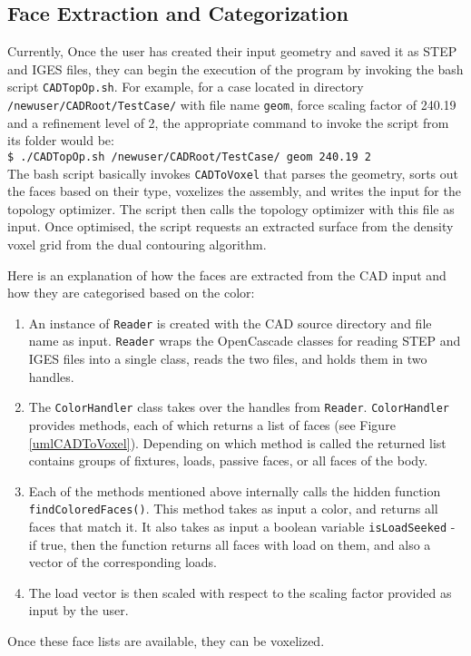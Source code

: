 \subsection{Face Extraction and Categorization}
\label{sec: FaceExtraction}


Currently, Once the user has created their input geometry and saved it as STEP and IGES files, they can begin the execution of the program by invoking the bash script \lstinline|CADTopOp.sh|. For example, for a case located in directory \lstinline|/newuser/CADRoot/TestCase/| with file name \lstinline|geom|, force scaling factor of 240.19 and a refinement level of 2, the appropriate command to invoke the script from its folder would be: \\

\lstinline|$ ./CADTopOp.sh /newuser/CADRoot/TestCase/ geom 240.19 2| \\

The bash script basically invokes \lstinline|CADToVoxel| that parses the geometry, sorts out the faces based on their type, voxelizes the assembly, and writes the input for the topology optimizer. The script then calls the topology optimizer with this file as input. Once optimised, the script requests an extracted surface from the density voxel grid from the dual contouring algorithm. 


Here is an explanation of how the faces are extracted from the CAD input and how they are categorised based on the color:

\begin{enumerate}
	\item An instance of \lstinline|Reader| is created with the CAD source directory and file name as input. \lstinline|Reader| wraps the OpenCascade classes for reading STEP and IGES files into a single class, reads the two files, and holds them in two handles.
	\item The \lstinline|ColorHandler| class takes over the handles from \lstinline|Reader|. \lstinline|ColorHandler| provides methods, each of which returns a list of faces (see Figure \ref{umlCADToVoxel}). Depending on which method is called the returned list contains groups of fixtures, loads, passive faces, or all faces of the body.
	\item Each of the methods mentioned above internally calls the hidden function \lstinline|findColoredFaces()|. This method takes as input a color, and returns all faces that match it. It also takes as input a boolean variable \lstinline|isLoadSeeked| - if true, then the function returns all faces with load on them, and also a vector of the corresponding loads.
	\item The load vector is then scaled with respect to the scaling factor provided as input by the user.
\end{enumerate}

Once these face lists are available, they can be voxelized.
